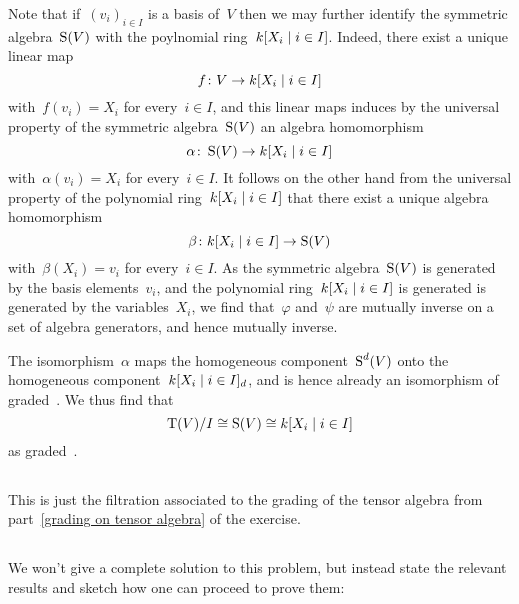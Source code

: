 Note that if~$(v_i)_{i \in I}$ is a basis of~$V$ then we may further identify the symmetric algebra~$\operatorname{S}(V)$ with the poylnomial ring~$k[X_i \suchthat i \in I]$.
Indeed, there exist a unique linear map
\[
          f
  \colon  V
  \to     k[X_i \suchthat i \in I]
\]
with~$f(v_i) = X_i$ for every~$i \in I$, and this linear maps induces by the universal property of the symmetric algebra~$\operatorname{S}(V)$ an algebra homomorphism
\[
          \alpha
  \colon  \Symm(V)
  \to     k[X_i \suchthat i \in I]
\]
with~$\alpha(v_i) = X_i$ for every~$i \in I$.
It follows on the other hand from the universal property of the polynomial ring~$k[X_i \suchthat i \in I]$ that there exist a unique algebra homomorphism
\[
          \beta
  \colon  k[X_i \suchthat i \in I]
  \to     \Symm(V)
\]
with~$\beta(X_i) = v_i$ for every~$i \in I$.
As the symmetric algebra~$\operatorname{S}(V)$ is generated by the basis elements~$v_i$, and the polynomial ring~$k[X_i \suchthat i \in I]$ is generated is generated by the variables~$X_i$, we find that~$\varphi$ and~$\psi$ are mutually inverse on a set of algebra generators, and hence mutually inverse.

The isomorphism~$\alpha$ maps the homogeneous component~$\operatorname{S}^d(V)$ onto the homogeneous component~$k[X_i \suchthat i \in I]_d$, and is hence already an isomorphism of graded~{\kalgs}.
We thus find that
\[
        \Tensor(V)/I
  \cong \Symm(V)
  \cong k[X_i \suchthat i \in I]
\]
as graded~{\kalgs}.











\subsection{}

This is just the filtration associated to the grading of the tensor algebra from part~\ref{grading on tensor algebra} of the exercise.





\subsection{}

We won’t give a complete solution to this problem, but instead state the relevant results and sketch how one can proceed to prove them:

